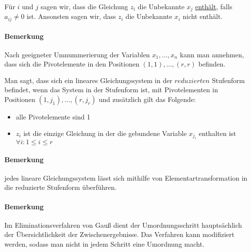  Für $ i $ und $ j $ sagen wir, dass die Gleichung $ z_i $ die Unbekannte $ x_j $ \underline{enthält}, falls $ a_{ij} \neq 0 $ ist. Ansonsten sagen wir, dass $ z_i $ die Unbekannte $ x_i $ nicht enthält.
 
 \paragraph{Bemerkung}
 Nach geeigneter Umnummerierung der Variablen $ x_1, \ldots, x_n $ kann man annehmen, dass sich die Pivotelemente in den Positionen $ (1,1), \ldots, (r,r) $ befinden.
 
 Man sagt, dass sich ein lineares Gleichungssystem in der $ reduzierten $ Stufenform befindet, wenn das System in der Stufenform ist, mit Pivotelementen in Positionen $ (1,j_1), \ldots, (r, j_r) $ und zusätzlich gilt das Folgende:
 \begin{itemize}
 	\item
 		alle Pivotelemente sind 1
 	\item
 		$ z_i $ ist die einzige Gleichung in der die gebundene Variable $ x_{j_{i}} $ enthalten ist $ \forall i: 1 \le i \le r $
 \end{itemize}
 
  \paragraph{Bemerkung}
  jedes lineare Gleichungssystem lässt sich mithilfe von Elementartransformation in die reduzierte Stufenform überführen.
  
  
  \paragraph{Bemerkung}
  Im Eliminationsverfahren von Gauß dient der Umordnungsschritt hauptsächlich der Übersichtlichkeit der Zwischenergebnisse. Das Verfahren kann modifiziert werden, sodass man nicht in jedem Schritt eine Umordnung macht.
 
